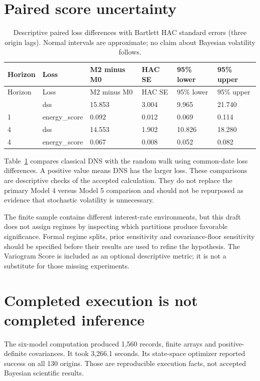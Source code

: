 \documentclass[
  12pt,
  letterpaper,
  DIV=11,
  numbers=noendperiod]{scrreprt}
\begin{document}
\section{Paired score uncertainty}\label{paired-score-uncertainty}

\begin{longtable}[]{@{}llllll@{}}
\caption{Descriptive paired loss differences with Bartlett HAC standard
errors (three origin lags). Normal intervals are approximate; no claim
about Bayesian volatility follows.}\label{tbl-comparison}\tabularnewline
\toprule\noalign{}
Horizon & Loss & M2 minus M0 & HAC SE & 95\% lower & 95\% upper \\
\midrule\noalign{}
\endfirsthead
\toprule\noalign{}
Horizon & Loss & M2 minus M0 & HAC SE & 95\% lower & 95\% upper \\
\midrule\noalign{}
\endhead
\bottomrule\noalign{}
\endlastfoot
1 & dss & 15.853 & 3.004 & 9.965 & 21.740 \\
1 & energy\_score & 0.092 & 0.012 & 0.069 & 0.114 \\
4 & dss & 14.553 & 1.902 & 10.826 & 18.280 \\
4 & energy\_score & 0.067 & 0.008 & 0.052 & 0.082 \\
\end{longtable}

Table~\ref{tbl-comparison} compares classical DNS with the random walk
using common-date loss differences. A positive value means DNS has the
larger loss. These comparisons are descriptive checks of the accepted
calculation. They do not replace the primary Model 4 versus Model 5
comparison and should not be repurposed as evidence that stochastic
volatility is unnecessary.

The finite sample contains different interest-rate environments, but
this draft does not assign regimes by inspecting which partitions
produce favorable significance. Formal regime splits, prior sensitivity
and covariance-floor sensitivity should be specified before their
results are used to refine the hypothesis. The Variogram Score is
included as an optional descriptive metric; it is not a substitute for
those missing experiments.

\section{Completed execution is not completed
inference}\label{completed-execution-is-not-completed-inference}

The six-model computation produced 1,560 records, finite arrays and
positive-definite covariances. It took 3,266.1 seconds. Its state-space
optimizer reported success on all 130 origins. Those are reproducible
execution facts, not accepted Bayesian scientific results.
\end{document}
